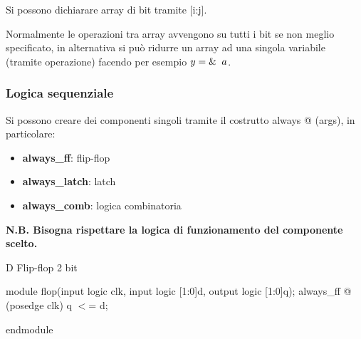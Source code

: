 \documentclass{article}
\begin{document}
Si possono dichiarare array di bit tramite [i:j].\newline

Normalmente le operazioni tra array avvengono su tutti i bit se non meglio specificato, in alternativa si può ridurre un array ad una singola variabile (tramite operazione) facendo per esempio $y=\And a$.

\subsubsection{Logica sequenziale}

Si possono creare dei componenti singoli tramite il costrutto always @ (args), in particolare:
\begin{itemize}
    \item \textbf{always\_ff}: flip-flop
    \item \textbf{always\_latch}: latch
    \item \textbf{always\_comb}: logica combinatoria
\end{itemize}

\vspace{1pt}

\textbf{N.B. Bisogna rispettare la logica di funzionamento del componente scelto.}

\begin{algorithm}
\caption{D Flip-flop 2 bit}
\begin{algorithmic}
\State module flop(input logic clk,
                   input logic [1:0]d,
                   output logic [1:0]q);
   \State   always\_ff @ (posedge clk)
            \State \qquad \qquad q  $<$= d;
            
\State endmodule
\end{algorithmic}
\end{algorithm}
\end{document}
